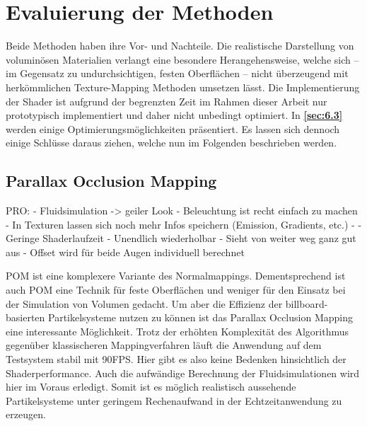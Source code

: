 \section{Evaluierung der Methoden}
\label{sec:5}

Beide Methoden haben ihre Vor- und Nachteile. Die realistische Darstellung von voluminösen Materialien verlangt 
eine besondere Herangehensweise, welche sich – im Gegensatz zu undurchsichtigen, festen Oberflächen – 
nicht überzeugend mit herkömmlichen Texture-Mapping Methoden umsetzen lässt. 
Die Implementierung der Shader ist aufgrund der 
begrenzten Zeit im Rahmen dieser Arbeit nur prototypisch implementiert und daher nicht unbedingt optimiert. 
In \textbf{\autoref{sec:6.3} } werden einige Optimierungsmöglichkeiten präsentiert. 
Es lassen sich dennoch einige Schlüsse daraus ziehen, welche nun im Folgenden beschrieben werden. 


\subsection{Parallax Occlusion Mapping}
\label{sec:5.1}

PRO: \newline
- Fluidsimulation -> geiler Look\newline
- Beleuchtung ist recht einfach zu machen \newline
- In Texturen lassen sich noch mehr Infos speichern (Emission, Gradients, etc.) \newline
- 
- Geringe Shaderlaufzeit\newline
- Unendlich wiederholbar\newline
- Sieht von weiter weg ganz gut aus\newline
- Offset wird für beide Augen individuell berechnet\newline

POM ist eine komplexere Variante des Normalmappings. Dementsprechend ist auch POM eine Technik für feste Oberflächen und weniger
für den Einsatz bei der Simulation von Volumen gedacht. Um aber die Effizienz der billboard-basierten Partikelsysteme 
nutzen zu können ist das Parallax Occlusion Mapping eine interessante Möglichkeit. Trotz der erhöhten Komplexität des Algorithmus
gegenüber klassischeren Mappingverfahren läuft die Anwendung auf dem Testsystem stabil mit 90FPS. Hier gibt es also keine 
Bedenken hinsichtlich der Shaderperformance. Auch die aufwändige Berechnung der Fluidsimulationen wird hier im Voraus erledigt. Somit
ist es möglich realistisch aussehende Partikelsysteme unter geringem Rechenaufwand in der Echtzeitanwendung zu erzeugen.
 

